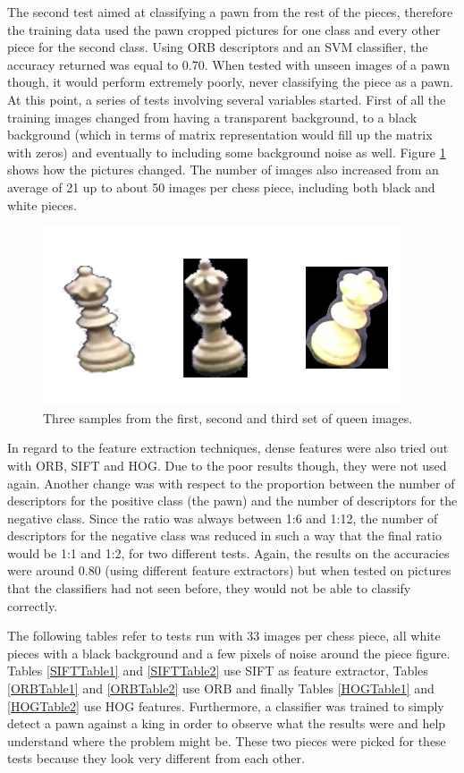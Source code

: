 \documentclass{l4proj}
\begin{document}
The second test aimed at classifying a pawn from the rest of the pieces, therefore the training data used the pawn cropped pictures for one class and every other piece for the second class. Using  ORB descriptors and an SVM classifier, the accuracy returned was equal to 0.70. When tested with unseen images of a pawn though, it would perform extremely poorly, never classifying the piece as a pawn. At this point, a series of tests involving several variables started. First of all the training images changed from having a transparent background, to a black background (which in terms of matrix representation would fill up the matrix with zeros) and eventually to including some background noise as well. Figure \ref{Images_changing} shows how the pictures changed. The number of images also increased from an average of 21 up to about 50 images per chess piece, including both black and white pieces.

\begin{figure}[h!]
\centering
\includegraphics[scale=0.5]{sequence_of_queens.png}
\caption{Three samples from the first, second and third set of queen images.}
\label{Images_changing}
\end{figure}

In regard to the feature extraction techniques, dense features were also tried out with ORB, SIFT and HOG. Due to the poor results though, they were not used again. Another change was with respect to the proportion between the number of descriptors for the positive class (the pawn) and the number of descriptors for the negative class. Since the ratio was always between 1:6 and 1:12, the number of descriptors for the negative class was reduced in such a way that the final ratio would be 1:1 and 1:2, for two different tests. Again, the results on the accuracies were around 0.80 (using different feature extractors) but when tested on pictures that the classifiers had not seen before, they would not be able to classify correctly.

The following tables refer to tests run with 33 images per chess piece, all white pieces with a black background and a few pixels of noise around the piece figure. Tables \ref{SIFTTable1} and \ref{SIFTTable2} use SIFT as feature extractor, Tables \ref{ORBTable1} and \ref{ORBTable2} use ORB and finally Tables \ref{HOGTable1} and \ref{HOGTable2} use HOG features. Furthermore, a classifier was trained to simply detect a pawn against a king in order to observe what the results were and help understand where the problem might be. These two pieces were picked for these tests because they look very different from each other.
\end{document}
